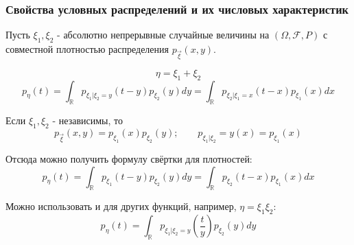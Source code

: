 \subsubsection{Свойства условных распределений и их числовых характеристик}
\begin{definition}
	Пусть $\xi_1, \xi_2$ - абсолютно непрерывные случайные величины на $(\Omega, \mathcal{F}, P)$ с совместной плотностью распределения $p_{\vec{\xi}}(x,y)$.

	\[\eta=\xi_1+\xi_2\]
	\[p_\eta(t)=\int_\mathbb{R} p_{\xi_1|\xi_2=y} (t-y) p_{\xi_2} (y)dy = \int_\mathbb{R} p_{\xi_2|\xi_1=x}(t-x) p_{\xi_1}(x)dx\]
	
	\noindent Если $\xi_1, \xi_2$ - независимы, то
	\[ p_{\vec{\xi}} (x, y) = p_{\xi_1} (x) p_{\xi_2} (y); ~~~~~~~~~ p_{\xi_1 | \xi_2} = y(x) = p_{\xi_1} (x) \]
	
	\noindent Отсюда можно получить формулу свёртки для плотностей:
	\[ p_{\eta} (t) = \int_{\mathbb{R}} p_{\xi_1} (t - y) p_{\xi_2} (y) dy = \int_{\mathbb{R}} p_{\xi_2} (t - x) p_{\xi_1} (x) dx \]
	
	\noindent Можно использовать и для других функций, например, $\eta = \xi_1 \xi_2$:
	\[ p_{\eta} (t) = \int_{\mathbb{R}} p_{\xi_1 | \xi_2 = y} \left( \frac{t}{y} \right) p_{\xi_2} (y) dy \]
\end{definition}

